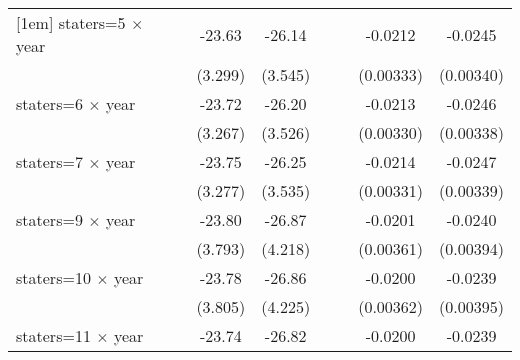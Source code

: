 {\begin{longtable}{l*{8}{c}}
[1em]
staters=5 $\times$ year&                     &                     &      -23.63\sym{***}&      -26.14\sym{***}&                     &                     &     -0.0212\sym{***}&     -0.0245\sym{***}\\
                    &                     &                     &     (3.299)         &     (3.545)         &                     &                     &   (0.00333)         &   (0.00340)         \\
[1em]
staters=6 $\times$ year&                     &                     &      -23.72\sym{***}&      -26.20\sym{***}&                     &                     &     -0.0213\sym{***}&     -0.0246\sym{***}\\
                    &                     &                     &     (3.267)         &     (3.526)         &                     &                     &   (0.00330)         &   (0.00338)         \\
[1em]
staters=7 $\times$ year&                     &                     &      -23.75\sym{***}&      -26.25\sym{***}&                     &                     &     -0.0214\sym{***}&     -0.0247\sym{***}\\
                    &                     &                     &     (3.277)         &     (3.535)         &                     &                     &   (0.00331)         &   (0.00339)         \\
[1em]
staters=9 $\times$ year&                     &                     &      -23.80\sym{***}&      -26.87\sym{***}&                     &                     &     -0.0201\sym{***}&     -0.0240\sym{***}\\
                    &                     &                     &     (3.793)         &     (4.218)         &                     &                     &   (0.00361)         &   (0.00394)         \\
[1em]
staters=10 $\times$ year&                     &                     &      -23.78\sym{***}&      -26.86\sym{***}&                     &                     &     -0.0200\sym{***}&     -0.0239\sym{***}\\
                    &                     &                     &     (3.805)         &     (4.225)         &                     &                     &   (0.00362)         &   (0.00395)         \\
[1em]
staters=11 $\times$ year&                     &                     &      -23.74\sym{***}&      -26.82\sym{***}&                     &                     &     -0.0200\sym{***}&     -0.0239\sym{***}\\

\end{longtable}}
